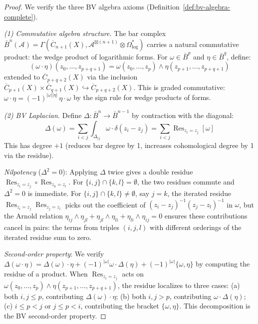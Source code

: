 \begin{proof}
We verify the three BV algebra axioms (Definition~\ref{def:bv-algebra-complete}).

\emph{(1) Commutative algebra structure.}
The bar complex $\bar{B}^n(\mathcal{A}) = \Gamma(\overline{C}_{n+1}(X), \mathcal{A}^{\boxtimes(n+1)} \otimes \Omega^*_{\log})$ carries a natural commutative product: the wedge product of logarithmic forms.  For $\omega \in \bar{B}^p$ and $\eta \in \bar{B}^q$, define:
\[
(\omega \cdot \eta)(z_0, \ldots, z_{p+q+1}) = \omega(z_0, \ldots, z_p) \wedge \eta(z_{p+1}, \ldots, z_{p+q+1})
\]
extended to $\overline{C}_{p+q+2}(X)$ via the inclusion $\overline{C}_{p+1}(X) \times \overline{C}_{q+1}(X) \hookrightarrow \overline{C}_{p+q+2}(X)$.  This is graded commutative: $\omega \cdot \eta = (-1)^{|\omega||\eta|}\, \eta \cdot \omega$ by the sign rule for wedge products of forms.

\emph{(2) BV Laplacian.}
Define $\Delta: \bar{B}^n \to \bar{B}^{n-1}$ by contraction with the diagonal:
\[
\Delta(\omega) = \sum_{i < j} \int_{\Delta_{ij}} \omega \cdot \delta(z_i - z_j) = \sum_{i < j} \operatorname{Res}_{z_i = z_j}[\omega]
\]
This has degree $+1$ (reduces bar degree by 1, increases cohomological degree by 1 via the residue).

\emph{Nilpotency} ($\Delta^2 = 0$): Applying $\Delta$ twice gives a double residue $\operatorname{Res}_{z_i = z_j} \circ \operatorname{Res}_{z_k = z_l}$.  For $\{i,j\} \cap \{k,l\} = \emptyset$, the two residues commute and $\Delta^2 = 0$ is immediate.  For $\{i,j\} \cap \{k,l\} \neq \emptyset$, say $j = k$, the iterated residue $\operatorname{Res}_{z_i = z_j}\operatorname{Res}_{z_j = z_l}$ picks out the coefficient of $(z_i - z_j)^{-1}(z_j - z_l)^{-1}$ in $\omega$, but the Arnold relation $\eta_{ij} \wedge \eta_{jl} + \eta_{jl} \wedge \eta_{li} + \eta_{li} \wedge \eta_{ij} = 0$ ensures these contributions cancel in pairs: the terms from triples $(i,j,l)$ with different orderings of the iterated residue sum to zero.

\emph{Second-order property}: We verify $\Delta(\omega \cdot \eta) = \Delta(\omega) \cdot \eta + (-1)^{|\omega|}\omega \cdot \Delta(\eta) + (-1)^{|\omega|}\{\omega, \eta\}$ by computing the residue of a product.  When $\operatorname{Res}_{z_i = z_j}$ acts on $\omega(z_0, \ldots, z_p) \wedge \eta(z_{p+1}, \ldots, z_{p+q+1})$, the residue localizes to three cases: (a) both $i, j \leq p$, contributing $\Delta(\omega) \cdot \eta$; (b) both $i, j > p$, contributing $\omega \cdot \Delta(\eta)$; (c) $i \leq p < j$ or $j \leq p < i$, contributing the bracket $\{\omega, \eta\}$.  This decomposition is the BV second-order property.


\end{proof}
